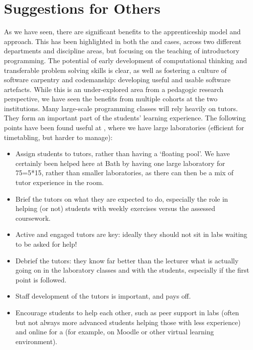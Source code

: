 \documentclass[conference,compsoc]{IEEEtran}
\begin{document}
\section{Suggestions for Others}

As we have seen, there are significant benefits to the apprenticeship model and approach. This has been highlighted in both the \Bath{} and \Cardiff{} cases, across two different departments and discipline areas, but focusing on the teaching of introductory programming. The potential of early development of computational thinking and transferable problem solving skills is clear, as well as fostering a culture of software carpentry and codemanship: developing useful and usable software artefacts. While this is an under-explored area from a pedagogic research perspective, we have seen the benefits from multiple cohorts at the two institutions.
Many large-scale programming classes will rely heavily on tutors. They form an important part of the students' learning experience. The following points have been found useful at \Bath, where we have large laboratories (efficient for timetabling, but harder to manage):
\begin{itemize}
\item	Assign students to tutors, rather than having a `floating pool'. We have certainly been helped here at Bath by having one large laboratory for 75=5*15, rather than smaller laboratories, as there can then be a mix of tutor experience in the room.
\item	Brief the tutors on what they are expected to do, especially the role in helping (or not) students with weekly exercises versus the assessed coursework.
\item	Active and engaged tutors are key: ideally they should not sit in labs waiting to be asked for help!
\item	Debrief the tutors: they know far better than the lecturer what is actually going on in the laboratory classes and with the students, especially if the first point is followed.
\item	Staff development of the tutors is important, and pays off.
\item Encourage students to help each other, such as peer support in labs (often but not always more advanced students helping those with less experience) and online for a (for example, on Moodle or other virtual learning environment).
\end{itemize} 
\end{document}
